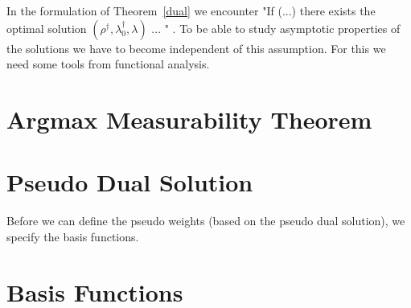 In the formulation of Theorem~\ref{dual} we encounter "If (...) there exists the optimal solution $(\rho^\dagger,\lambda_0^\dagger,\lambda)$ ... " .
To be able to study asymptotic properties of the solutions we have to become independent of this assumption.
For this we need some tools from functional analysis.
\section{Argmax Measurability Theorem}

\section{Pseudo Dual Solution}

Before we can define the pseudo weights (based on the pseudo dual solution), we specify the basis functions.
\section{Basis Functions}

